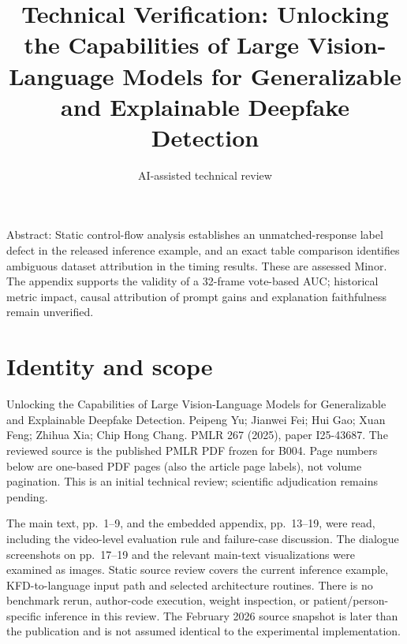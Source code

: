 \documentclass[10pt]{article}
\title{Technical Verification: Unlocking the Capabilities of Large Vision-Language Models for Generalizable and Explainable Deepfake Detection}
\author{AI-assisted technical review}
\date{}
\begin{document}
\maketitle
Abstract: Static control-flow analysis establishes an unmatched-response label defect in the released inference example, and an exact table comparison identifies ambiguous dataset attribution in the timing results. These are assessed Minor. The appendix supports the validity of a 32-frame vote-based AUC; historical metric impact, causal attribution of prompt gains and explanation faithfulness remain unverified.\par
\section*{Identity and scope}
Unlocking the Capabilities of Large Vision-Language Models for Generalizable and Explainable Deepfake Detection. Peipeng Yu; Jianwei Fei; Hui Gao; Xuan Feng; Zhihua Xia; Chip Hong Chang. PMLR 267 (2025), paper I25-43687. The reviewed source is the published PMLR PDF frozen for B004. Page numbers below are one-based PDF pages (also the article page labels), not volume pagination. This is an initial technical review; scientific adjudication remains pending.\par
The main text, pp. 1–9, and the embedded appendix, pp. 13–19, were read, including the video-level evaluation rule and failure-case discussion. The dialogue screenshots on pp. 17–19 and the relevant main-text visualizations were examined as images. Static source review covers the current inference example, KFD-to-language input path and selected architecture routines. There is no benchmark rerun, author-code execution, weight inspection, or patient/person-specific inference in this review. The February 2026 source snapshot is later than the publication and is not assumed identical to the experimental implementation.\par
\end{document}
